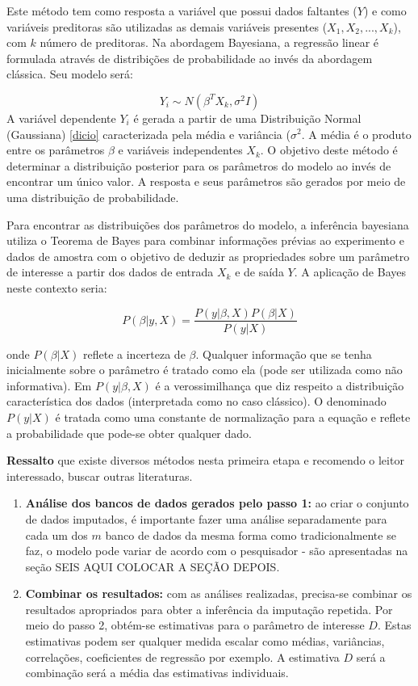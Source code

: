 \documentclass[
  openany]{book}
\begin{document}
Este método tem como resposta a variável que possui dados faltantes (\(Y\)) e como variáveis preditoras são utilizadas as demais variáveis presentes (\(X_1, X_2,..., X_k\)), com \(k\) número de preditoras. Na abordagem Bayesiana, a regressão linear é formulada através de distribições de probabilidade ao invés da abordagem clássica. Seu modelo será:

\[Y_i \sim N(\beta^T X_k , \sigma ^2 I)\]
A variável dependente \(Y_i\) é gerada a partir de uma Distribuição Normal (Gaussiana) \ref{dicio} caracterizada pela média e variância (\(\sigma^2\). A média é o produto entre os parâmetros \(\beta\) e variáveis independentes \(X_k\). O objetivo deste método é determinar a distribuição posterior para os parâmetros do modelo ao invés de encontrar um único valor. A resposta e seus parâmetros são gerados por meio de uma distribuição de probabilidade.

Para encontrar as distribuições dos parâmetros do modelo, a inferência bayesiana utiliza o Teorema de Bayes para combinar informações prévias ao experimento e dados de amostra com o objetivo de deduzir as propriedades sobre um parâmetro de interesse a partir dos dados de entrada \(X_k\) e de saída \(Y\). A aplicação de Bayes neste contexto seria:

\begin{equation}
  P(\beta|y,X)=\frac{P(y|\beta,X)P(\beta|X)}{P(y|X)}
  \label{eq:reglinbayes}
\end{equation}

onde \(P(\beta|X)\) reflete a incerteza de \(\beta\). Qualquer informação que se tenha inicialmente sobre o parâmetro é tratado como ela (pode ser utilizada como não informativa).
Em \(P(y|\beta,X)\) é a verossimilhança que diz respeito a distribuição característica dos dados (interpretada como no caso clássico). O denominado \(P(y|X)\) é tratada como uma constante de normalização para a equação e reflete a probabilidade que pode-se obter qualquer dado.

\textbf{Ressalto} que existe diversos métodos nesta primeira etapa e recomendo o leitor interessado, buscar outras literaturas.

\begin{enumerate}
\def\labelenumi{\arabic{enumi}.}
\setcounter{enumi}{1}
\item
  \textbf{Análise dos bancos de dados gerados pelo passo 1:} ao criar o conjunto de dados imputados, é importante fazer uma análise separadamente para cada um dos \(m\) banco de dados da mesma forma como tradicionalmente se faz, o modelo pode variar de acordo com o pesquisador - são apresentadas na seção SEIS AQUI COLOCAR A SEÇÃO DEPOIS.
\item
  \textbf{Combinar os resultados:} com as análises realizadas, precisa-se combinar os resultados apropriados para obter a inferência da imputação repetida. Por meio do passo 2, obtém-se estimativas para o parâmetro de interesse \(D\). Estas estimativas podem ser qualquer medida escalar como médias, variâncias, correlações, coeficientes de regressão por exemplo. A estimativa \(D\) será a combinação será a média das estimativas individuais.
\end{enumerate}
\end{document}
